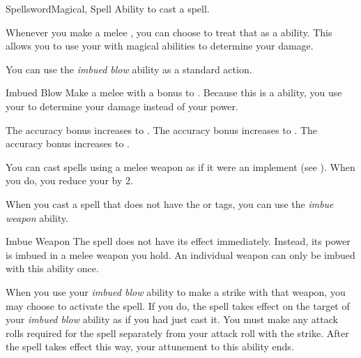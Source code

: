     \begin{feat}{Spellsword}{Magical, Spell}
        \featpre Ability to cast a spell.

         Whenever you make a melee , you can choose to treat that as a  ability.
        This allows you to use your  with magical abilities to determine your damage.

         You can use the \textit{imbued blow} ability as a standard action.
        \begin{freeability}{Imbued Blow}
            Make a melee  with a  bonus to .
            Because this is a  ability, you use your   to determine your damage instead of your  power.

            \rankline
             The accuracy bonus increases to .
             The accuracy bonus increases to .
             The accuracy bonus increases to .
        \end{freeability}

         You can cast spells using a melee weapon as if it were an implement (see ).
        When you do, you reduce your  by 2.

         When you cast a spell that does not have the  or  tags,
            you can use the \textit{imbue weapon} ability.
        \begin{attuneability}{Imbue Weapon}
            \rankline
            The spell does not have its effect immediately.
            Instead, its power is imbued in a melee weapon you hold.
            An individual weapon can only be imbued with this ability once.

            When you use your \textit{imbued blow} ability to make a strike with that weapon, you may choose to activate the spell.
            If you do, the spell takes effect on the target of your \textit{imbued blow} ability as if you had just cast it.
            You must make any attack rolls required for the spell separately from your attack roll with the strike.
            After the spell takes effect this way, your attunement to this ability ends.
        \end{attuneability}


\end{feat}
